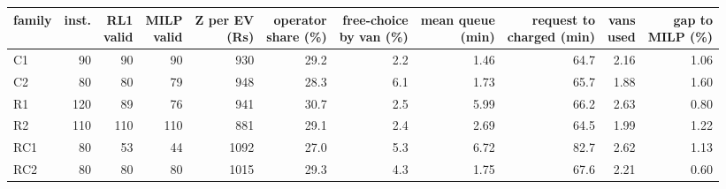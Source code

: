 \begin{tabular}{@{}lrrrrrrrrrr@{}}
\toprule
family & inst. & \shortstack[r]{RL1\\valid} & \shortstack[r]{MILP\\valid} & \shortstack[r]{Z per EV\\(Rs)} & \shortstack[r]{operator\\share (\%)} & \shortstack[r]{free-choice\\by van (\%)} & \shortstack[r]{mean queue\\(min)} & \shortstack[r]{request to\\charged (min)} & \shortstack[r]{vans\\used} & \shortstack[r]{gap to\\MILP (\%)} \\
\midrule
C1 & 90 & 90 & 90 & 930 & 29.2 & 2.2 & 1.46 & 64.7 & 2.16 & 1.06 \\
C2 & 80 & 80 & 79 & 948 & 28.3 & 6.1 & 1.73 & 65.7 & 1.88 & 1.60 \\
R1 & 120 & 89 & 76 & 941 & 30.7 & 2.5 & 5.99 & 66.2 & 2.63 & 0.80 \\
R2 & 110 & 110 & 110 & 881 & 29.1 & 2.4 & 2.69 & 64.5 & 1.99 & 1.22 \\
RC1 & 80 & 53 & 44 & 1092 & 27.0 & 5.3 & 6.72 & 82.7 & 2.62 & 1.13 \\
RC2 & 80 & 80 & 80 & 1015 & 29.3 & 4.3 & 1.75 & 67.6 & 2.21 & 0.60 \\
\bottomrule
\end{tabular}
